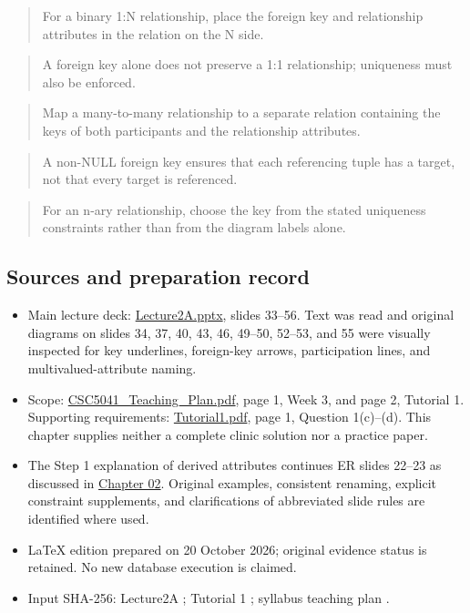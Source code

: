 \begin{quote}
For a binary 1:N relationship, place the foreign key and relationship attributes in the relation on the N side.
\end{quote}

\begin{quote}
A foreign key alone does not preserve a 1:1 relationship; uniqueness must also be enforced.
\end{quote}

\begin{quote}
Map a many-to-many relationship to a separate relation containing the keys of both participants and the relationship attributes.
\end{quote}

\begin{quote}
A non-NULL foreign key ensures that each referencing tuple has a target, not that every target is referenced.
\end{quote}

\begin{quote}
For an n-ary relationship, choose the key from the stated uniqueness constraints rather than from the diagram labels alone.
\end{quote}

\subsection{Sources and preparation record}\label{04_er_to_relational_mapping_en-sources-and-preparation-record}

\begin{itemize}
\tightlist
\item
  Main lecture deck: \href{../../../slides/Lecture2A.pptx}{Lecture2A.pptx}, slides 33--56. Text was read and original diagrams on slides 34, 37, 40, 43, 46, 49--50, 52--53, and 55 were visually inspected for key underlines, foreign-key arrows, participation lines, and multivalued-attribute naming.
\item
  Scope: \href{../../../syllabus/CSC5041_Teaching_Plan.pdf}{CSC5041\_Teaching\_Plan.pdf}, page 1, Week 3, and page 2, Tutorial 1. Supporting requirements: \href{../../../slides/Tutorial1.pdf}{Tutorial1.pdf}, page 1, Question 1(c)--(d). This chapter supplies neither a complete clinic solution nor a practice paper.
\item
  The Step 1 explanation of derived attributes continues ER slides 22--23 as discussed in \hyperref[02_er_modelling_en]{Chapter 02}. Original examples, consistent renaming, explicit constraint supplements, and clarifications of abbreviated slide rules are identified where used.
\item
  LaTeX edition prepared on 20 October 2026; original evidence status is retained. No new database execution is claimed.
\item
  Input SHA-256: Lecture2A \texttt{}; Tutorial 1 \texttt{}; syllabus teaching plan \texttt{}.
\end{itemize}
